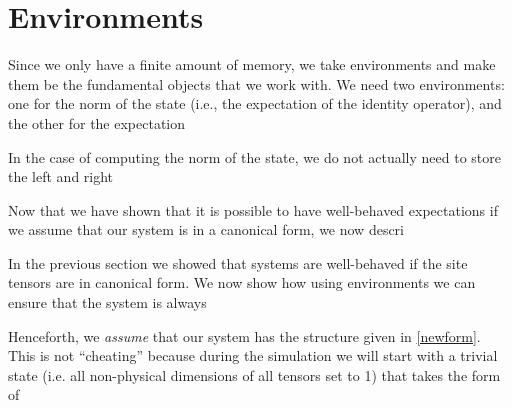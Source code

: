 \documentclass{article}
\begin{document}
\section{Environments}

Since we only have a finite amount of memory, we take environments and make them be the fundamental objects that we work with.  We need two environments: one for the norm of the state (i.e., the expectation of the identity operator), and the other for the expectation 

In the case of computing the norm of the state, we do not actually need to store the left and right 

Now that we have shown that it is possible to have well-behaved expectations if we assume that our system is in a canonical form, we now descri

In the previous section we showed that systems are well-behaved if the site tensors are in canonical form.  We now show how using environments we can ensure that the system is always 

Henceforth, we \emph{assume} that our system has the structure given in \eqref{newform}.  This is not ``cheating'' because during the simulation we will start with a trivial state (i.e. all non-physical dimensions of all tensors set to 1) that takes the form of
\end{document}
